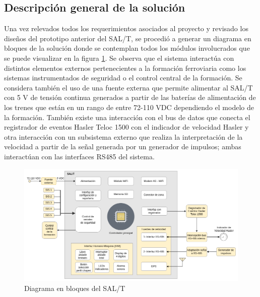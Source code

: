 \subsection{Descripción general de la solución}

Una vez relevados todos los requerimientos asociados al proyecto y revisado los diseños del prototipo anterior del SAL/T, se procedió a generar un diagrama en bloques de la solución donde se contemplan todos los módulos involucrados que se puede visualizar en la figura \ref{fig:diagrama_bloques}. Se observa que el sistema interactúa con distintos elementos externos pertenecientes a la formación ferroviaria como los sistemas instrumentados de seguridad o el control central de la formación. Se considera también el uso de una fuente externa que permite alimentar al SAL/T con 5 V de tensión continua generados a partir de las baterías de alimentación de los trenes que están en un rango de entre 72-110 VDC dependiendo el modelo de la formación. También existe una interacción con el bus de datos que conecta el registrador de eventos Hasler Teloc 1500 \cite{hasler} con el indicador de velocidad Hasler y otra interacción con un subsistema externo que realiza la interpretación de la velocidad a partir de la señal generada por un generador de impulsos; ambas interactúan con las interfaces RS485 del sistema. 



\begin{figure}[H]
    \centering
    \includegraphics[width=\linewidth]{img/diagrama_bloques.png}
    \caption{Diagrama en bloques del SAL/T}
    \label{fig:diagrama_bloques}
\end{figure}

